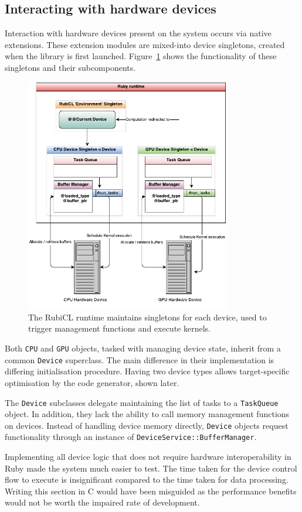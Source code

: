 \subsection{Interacting with hardware devices}
Interaction with hardware devices present on the system occurs via native extensions. These extension modules are mixed-into device singletons, created when the library is first launched. Figure~\ref{fig:rubicl_devices} shows the functionality of these singletons and their subcomponents.

\begin{figure}[h]
  \includegraphics[width=0.8\textwidth]{./figures/arch_diagram.pdf}
  \caption{The RubiCL runtime maintains singletons for each device, used to trigger management functions and execute kernels.}
  \label{fig:rubicl_devices}
\end{figure}

Both \verb|CPU| and \verb|GPU| objects, tasked with managing device state, inherit from a common \verb|Device| superclass. The main difference in their implementation is differing initialisation procedure. Having two device types allows target-specific optimisation by the code generator, shown later.

The \verb|Device| subclasses delegate maintaining the list of tasks to a \verb|TaskQueue| object. In addition, they lack the ability to call memory management functions on devices.
Instead of handling device memory directly, \verb|Device| objects request functionality through an instance of \verb|DeviceService::BufferManager|.

Implementing all device logic that does not require hardware interoperability in Ruby made the system much easier to test. The time taken for the device control flow to execute is insignificant compared to the time taken for data processing. Writing this section in C would have been misguided as the performance benefits would not be worth the impaired rate of development.


